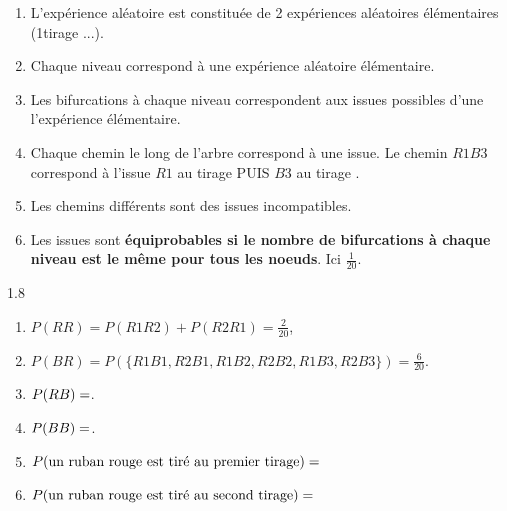\documentclass[main.tex]{subfiles}
\begin{document}
\begin{example}
{ 
		}\hfill
\begin{enumerate}[label={\textbullet},leftmargin=*] 
	\item L'expérience aléatoire est constituée de 2 expériences aléatoires élémentaires (1\ier tirage ...).
	\item Chaque niveau correspond à une expérience aléatoire élémentaire.
	\item Les bifurcations à chaque niveau correspondent aux issues possibles d'une l'expérience élémentaire.
	\item Chaque chemin le long de l'arbre correspond à une issue. Le chemin $R1B3$ correspond à l'issue \og $R1$ au tirage  PUIS $B3$ au tirage \fg.
	\item Les chemins différents sont des issues incompatibles.
	\item Les issues sont \textbf{équiprobables si le nombre de bifurcations à chaque niveau est le même pour tous les noeuds}. Ici $\tfrac{1}{20}$.
\end{enumerate}	 
\begin{spacing}{1.8}
\begin{enumerate}[label={},leftmargin=* ] 
	\item  $P(RR)= P(R1R2) + P(R2R1)=\frac{2}{20}$, 
	\item $P(BR)= P(\{R1B1,R2B1,R1B2,R2B2,R1B3,R2B3\})=\frac{6}{20}$. 
	\item $P(RB)= \dotfill $.
	\item $P(BB)= \dotfill $.
	\item $P(\text{un ruban rouge est tiré au premier tirage})=\dotfill$
	\item $P(\text{un ruban rouge est tiré au second tirage})=\dotfill$
\end{enumerate}
\end{spacing}
\vspace{-1.0em}
\end{example}
\end{document}

